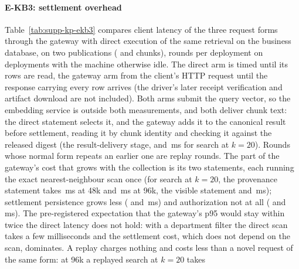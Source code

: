 \documentclass[journal,onecolumn]{IEEEtran}
\begin{document}
\paragraph{E-KB3: settlement overhead}
Table~\ref{tab:supp-kp-ekb3} compares client latency of the three request
forms through the gateway with direct execution of the same retrieval on the
business database, on two publications (\KbEkbThreeFortyEightKChunks{} and
\KbEkbThreeNinetySixKChunks{} chunks), \KbEkbThreeFortyEightKRounds{} rounds
per deployment on \KbEkbThreeFortyEightKDeployments{} deployments with the
machine otherwise idle. The direct arm is timed until its rows are read, the
gateway arm from the client's HTTP request until the response carrying every
row arrives (the driver's later receipt verification and artifact download
are not included). Both arms submit the query vector, so the embedding
service is outside both measurements, and both deliver chunk text: the
direct statement selects it, and the gateway adds it to the canonical result
before settlement, reading it by chunk identity and checking it against the
released digest (the result-delivery stage,
\KbEkbThreeFortyEightKSearchFactGateKTwentyNovelResultDelivery{} and
\KbEkbThreeNinetySixKSearchFactGateKTwentyNovelResultDelivery{}\,ms for
search at $k=20$). Rounds whose normal form
repeats an earlier one are replay rounds. The part of the gateway's cost that
grows with the collection is its two statements, each running the exact
nearest-neighbour scan once (for search at $k=20$, the provenance statement
takes \KbEkbThreeFortyEightKSearchFactGateKTwentyNovelProvenancePostgresql{}\,ms
at 48k and
\KbEkbThreeNinetySixKSearchFactGateKTwentyNovelProvenancePostgresql{}\,ms at
96k, the visible statement
\KbEkbThreeFortyEightKSearchFactGateKTwentyNovelBusinessPostgresql{} and
\KbEkbThreeNinetySixKSearchFactGateKTwentyNovelBusinessPostgresql{}\,ms);
settlement persistence grows less
(\KbEkbThreeFortyEightKSearchFactGateKTwentyNovelSettlePersist{} and
\KbEkbThreeNinetySixKSearchFactGateKTwentyNovelSettlePersist{}\,ms) and
authorization not at all
(\KbEkbThreeFortyEightKSearchFactGateKTwentyNovelAuthorization{} and
\KbEkbThreeNinetySixKSearchFactGateKTwentyNovelAuthorization{}\,ms). The
pre-registered expectation that the gateway's p95 would stay within twice
the direct latency does not hold: with a department filter the direct scan
takes a few milliseconds and the settlement cost, which does not depend on
the scan, dominates. A replay charges nothing and costs less than a novel request of the same
form: at 96k a replayed search at $k=20$ takes
\end{document}
